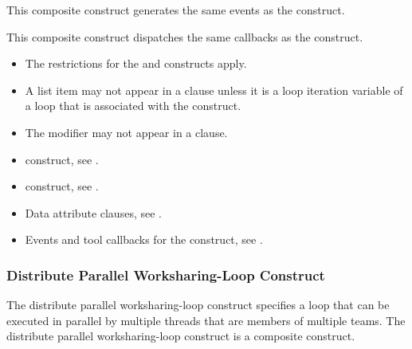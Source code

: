 \events

This composite construct generates the same events as the  construct.

\tools

This composite construct dispatches the same callbacks as the  construct.

\restrictions
\begin{itemize}
\item The restrictions for the  and  constructs apply.

\item A list item may not appear in a  clause unless it is a
loop iteration variable of a loop that is associated with the construct.

\item The  modifier may not appear in a  clause.
\end{itemize}

\crossreferences
\begin{itemize}
\item {} construct, see
.

\item {} construct, see
.

\item Data attribute clauses, see
.

\item Events and tool callbacks for the  construct, see
.

\end{itemize}









\subsubsection{Distribute Parallel Worksharing-Loop Construct}
\label{subsec:Distribute Parallel Worksharing-Loop Construct}
\summary
The distribute parallel worksharing-loop construct specifies a loop that can be executed in parallel by
multiple threads that are members of multiple teams. The distribute parallel worksharing-loop construct is a composite construct.

